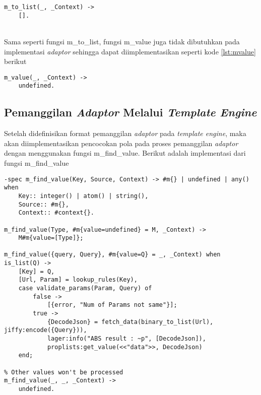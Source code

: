 \begin{minipage}{\linewidth}
\begin{lstlisting}[caption={Implementasi fungsi m\_to\_list},label={lst:mtolist}]
m_to_list(_, _Context) ->
	[].
\end{lstlisting}
\end{minipage}\\

Sama seperti fungsi m\_to\_list, fungsi m\_value juga tidak dibutuhkan pada implementasi \textit{adaptor} sehingga dapat diimplementasikan seperti kode \ref{lst:mvalue} berikut

\begin{minipage}{\linewidth}
\begin{lstlisting}[caption={Implementasi fungsi m\_value},label={lst:mvalue}]
m_value(_, _Context) ->
	undefined.
\end{lstlisting}
\end{minipage}

\subsection{Pemanggilan \textit{Adaptor} Melalui \textit{Template Engine}}

Setelah didefinisikan format pemanggilan \textit{adaptor} pada \textit{template engine}, maka akan diimplementasikan pencocokan pola pada proses pemanggilan \textit{adaptor} dengan menggunakan fungsi m\_find\_value. Berikut adalah implementasi dari fungsi m\_find\_value

\begin{minipage}{\linewidth}
\begin{lstlisting}[caption={Implementasi fungsi m\_find\_value},label={lst:mfindvalue}]
% this method to handle call api from template
-spec m_find_value(Key, Source, Context) -> #m{} | undefined | any() when
	Key:: integer() | atom() | string(),
	Source:: #m{},
	Context:: #context{}.

m_find_value(Type, #m{value=undefined} = M, _Context) ->
	M#m{value=[Type]};

m_find_value({query, Query}, #m{value=Q} = _, _Context) when is_list(Q) ->
	[Key] = Q,
	[Url, Param] = lookup_rules(Key),
	case validate_params(Param, Query) of
		false ->
			[{error, "Num of Params not same"}];
		true ->
			{DecodeJson} = fetch_data(binary_to_list(Url), jiffy:encode({Query})),
			lager:info("ABS result : ~p", [DecodeJson]),
			proplists:get_value(<<"data">>, DecodeJson)
	end;

% Other values won't be processed
m_find_value(_, _, _Context) ->
	undefined. 
\end{lstlisting}
\end{minipage}\\

